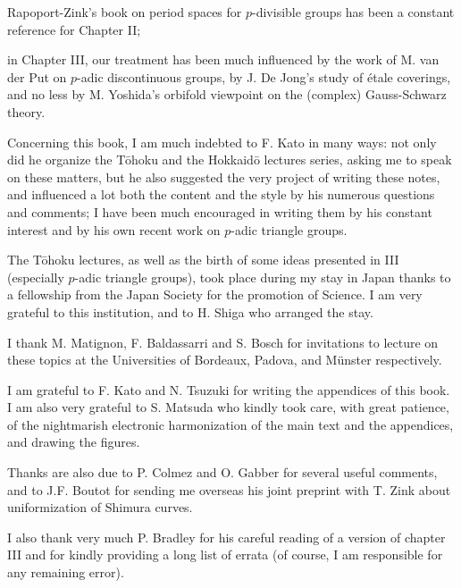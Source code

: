 Rapoport-Zink's book on period spaces for $p$-divisible groups has been
a constant reference for Chapter II;

in Chapter III, our treatment has been much influenced by the work of
M. van der Put on $p$-adic discontinuous groups, by J. De Jong's study
of \'etale coverings, and no less by M. Yoshida's orbifold viewpoint on
the (complex) Gauss-Schwarz theory.

\medskip

Concerning this book, I am much indebted to F. Kato in many ways: not
only did he organize the T\={o}hoku and the Hokkaid\={o} lectures
series, asking me to speak on these matters, but he also suggested the
very project of writing these notes, and influenced a lot both the
content and the style by his numerous questions and comments; I have
been much encouraged in writing them by his constant interest and by his
own recent work on $p$-adic triangle groups.

\medskip

The T\={o}hoku lectures, as well as the birth of some ideas presented in
III (especially $p$-adic triangle groups), took place during my stay in
Japan thanks to a fellowship from the Japan Society for the promotion of
Science. I am very grateful to this institution, and to H. Shiga who
arranged the stay.

\medskip

I thank M. Matignon, F. Baldassarri and S. Bosch for invitations to
lecture on these topics at the Universities of Bordeaux, Padova, and
M\"unster respectively.

 \medskip

I am grateful to F. Kato and N. Tsuzuki for writing the appendices of
this book. I am also very grateful to S. Matsuda who kindly took care,
with great patience, of the nightmarish electronic harmonization of the
main text and the appendices, and drawing the figures.

 \medskip

Thanks are also due to P. Colmez and O. Gabber for several useful
comments, and to J.F. Boutot for sending me overseas his joint preprint
with T. Zink about uniformization of Shimura curves.

I also thank very much P. Bradley for his careful reading of a version
of chapter III and for kindly providing a long list of errata (of
course, I am responsible for any remaining error).

